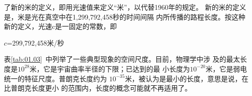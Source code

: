 \noindent 了新的米的定义，即用光速值来定义“米”，以代替1960年的规定。
新的米的定义是，米是光在真空中在1,299,792,458秒的时间间隔
内所传播的路程长度。按这种新的定义，光速c是一固定的常数，即

\centerline{$c$=299,792,458米/秒}

表\ref{tab:01.03}~中列举了一些典型现象的空间尺度。目前，物理学中涉
及的最太长度是$10^{28}$米，它是宇宙曲率半径的下限；已达到的最
小长度为$10^{-20}$米，它是弱电统一的特征尺度。普朗克长度约为
$10^{-35}$米，被认为是最小的长度，意思是说，在比普朗克长度更小
的范围内，长度的概念可能就不再适用了。
